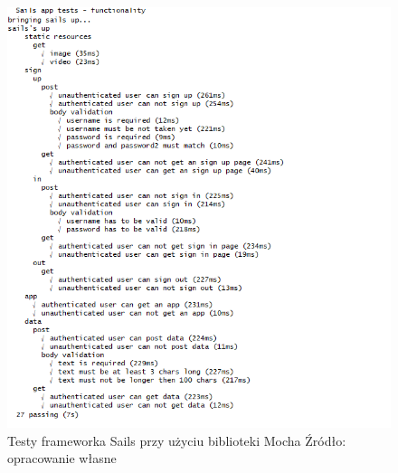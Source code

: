 \documentclass[12pt]{report}
\begin{document}
      \begin{figure}[H]
        \centering
        \includegraphics[width=\textwidth,height=\textheight,keepaspectratio]{test_Sails.png} 
        \caption{Testy frameworka Sails przy użyciu biblioteki Mocha \newline Źródło: opracowanie własne}
      \end{figure}

    \pagebreak
\end{document}
